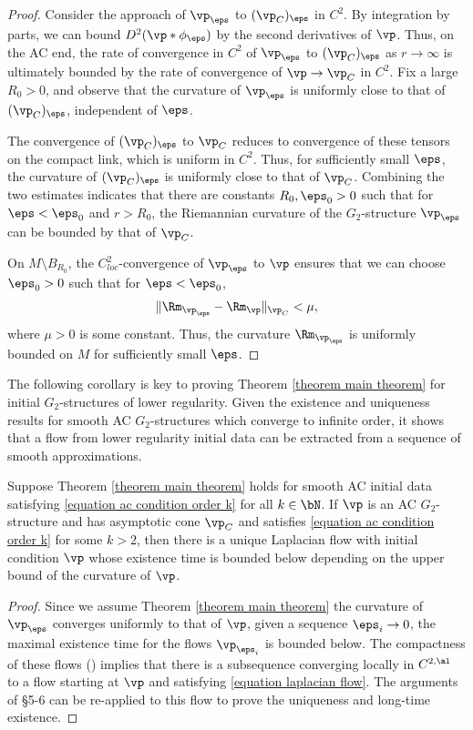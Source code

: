 \documentclass[hidelinks, 12pt, oneside, reqno]{amsart}
\begin{document}
\begin{proof}
    Consider the approach of $\vp_\eps$ to $(\vp_C)_\eps$ in $C^2$. By integration by parts, we can bound $D^2(\vp * \phi_\eps)$ by the second derivatives of $\vp$.   Thus, on the AC end, the rate of convergence in $C^2$ of $\vp_\eps$ to $(\vp_C)_\eps$ as $r \rightarrow \infty$ is ultimately bounded by the rate of convergence of $\vp \rightarrow \vp_C$ in $C^2$. Fix a large $R_0 > 0$, and observe that the curvature of $\vp_\eps$ is uniformly close to that of $(\vp_C)_\eps$, independent of $\eps$. 
    
    The convergence of $(\vp_C)_\eps$ to $\vp_C$ reduces to convergence of these tensors on the compact link, which is uniform in $C^2$. Thus, for sufficiently small $\eps$, the curvature of $(\vp_C)_\eps$ is uniformly close to that of $\vp_C$. Combining the two estimates indicates that there are constants $R_0,\eps_0 >0$ such that for $\eps < \eps_0$ and $r > R_0$, the Riemannian curvature of the $G_2$-structure $\vp_\eps$ can be bounded by that of $\vp_C$. 

    On $M \setminus B_{R_0}$, the $C^2_{loc}$-convergence of $\vp_\eps$ to $\vp$ ensures that we can choose $\eps_0 >0$ such that for $\eps < \eps_0$, 
    \[
    \|\Rm_{\vp_\eps} - \Rm_{\vp}\|_{\vp_C} < \mu, 
    \]
    where $\mu > 0$ is some constant. Thus, the curvature $\Rm_{\vp_\eps}$ is uniformly bounded on $M$ for sufficiently small $\eps$. 
\end{proof}

The following corollary is key to proving Theorem \ref{theorem main theorem} for initial $G_2$-structures of lower regularity. Given the existence and uniqueness results for smooth AC $G_2$-structures which converge to infinite order, it shows that a flow from lower regularity initial data can be extracted from a sequence of smooth approximations.

\begin{cor}\label{corollary existence for lower regularity}
    Suppose Theorem \ref{theorem main theorem} holds for smooth AC initial data satisfying \eqref{equation ac condition order k} for all $k \in \bN$. If $\vp$ is an AC $G_2$-structure and has asymptotic cone $\vp_C$ and satisfies \eqref{equation ac condition order k} for some $k > 2$, then there is a unique Laplacian flow with initial condition $\vp$ whose existence time is bounded below depending on the upper bound of the curvature of $\vp$. 
\end{cor}

\begin{proof}
    Since we assume Theorem \ref{theorem main theorem} the curvature of $\vp_\eps$ converges uniformly to that of $\vp$, given a sequence $\eps_i \rightarrow 0$, the maximal existence time for the flows $\vp_{\eps_i}$ is bounded below. The compactness of these flows (\cite[Theorem 7.2]{LotayWeiLaplacianFlow}) implies that there is a subsequence converging locally in $C^{2,\al}$ to a flow starting at $\vp$ and satisfying \eqref{equation laplacian flow}. The arguments of \S 5-6 can be re-applied to this flow to prove the uniqueness and long-time existence. 
\end{proof}
\end{document}
